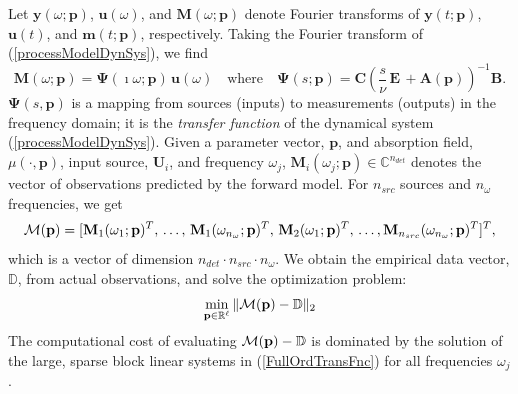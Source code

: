 \documentclass{report}
\begin{document}
Let $ \mathbf{y}(\omega; \mathbf{p})$, $ \mathbf{u}(\omega)$, and $
\mathbf{M}(\omega; \mathbf{p})$
denote Fourier transforms of $\mathbf{y}(t; \mathbf{p})$, $ \mathbf{u}(t)$, and
$ \boldsymbol{m}(t; \mathbf{p})$, respectively.
Taking the Fourier transform of (\ref{processModelDynSys}), we find
\begin{equation} \label{FullOrdTransFnc}
\mathbf{M}(\omega; \mathbf{p}) = \boldsymbol{\Psi}\!\left(\imath\omega;
\mathbf{p}\right)\,
\mathbf{u}(\omega)\quad \mbox{where}\quad \boldsymbol{\Psi}(s; \mathbf{p})=
\mathbf{C}\left(\frac{s}{\nu}\, \mathbf{E}\, + \mathbf{A}(
\mathbf{p})\right)^{-1} \mathbf{B}.
\end{equation}
$ \boldsymbol{\Psi}(s, \mathbf{p})$ is a mapping from sources (inputs) to
measurements (outputs)
in the frequency domain; it is the \emph{transfer function} of the dynamical system
(\ref{processModelDynSys}).
Given a parameter vector, $ \mathbf{p}$, and absorption field, $\mu(\cdot, \mathbf{p})$,
input source, $ \mathbf{U}_i$, and frequency $\omega_j$,
$ \mathbf{M}_i(\omega_j; \mathbf{p})\in\mathbb{C}^{n_{det}}$ denotes
the vector of observations predicted by the forward model.
For $n_{src}$ sources and $n_{\omega}$ frequencies, we get
\[ {\cal M}( \mathbf{p}) = [ \mathbf{M}_1(\omega_1; \mathbf{p})^T,\,
\ldots,\, \mathbf{M}_1(\omega_{n_\omega};
\mathbf{p})^T,\, \mathbf{M}_2(\omega_1; \mathbf{p})^T,\, \ldots, \mathbf{M}_{n_{src}}
(\omega_{n_\omega}; \mathbf{p})^T ]^T ,\]
which is a vector of dimension $n_{det}\cdot n_{src} \cdot n_{\omega} $.
We obtain the empirical data vector,
$\mathbb{D}$, from actual observations, and solve the optimization problem:
\[ \min_{ \mathbf{p} \in \mathbb{R}^\ell} \| {\cal M}( \mathbf{p}) - \mathbb{D} \|_2 \]
The computational cost of evaluating ${\cal M}( \mathbf{p}) - \mathbb{D}$ is dominated
by the solution of the large, sparse block linear systems in (\ref{FullOrdTransFnc})
for all frequencies $\omega_j$.
\end{document}
